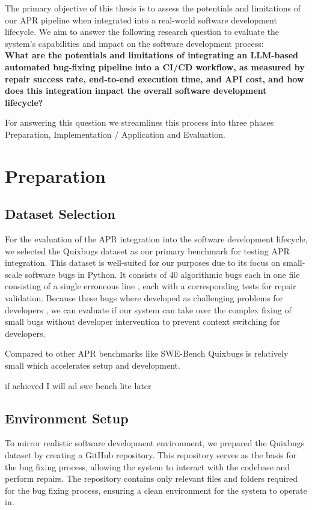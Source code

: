The primary objective of this thesis is to assess the potentials and limitations of our APR pipeline when integrated into a real-world software development lifecycle. We aim to answer the following research question to evaluate the system's capabilities and impact on the software development process: \\
\textbf{What are the potentials and limitations of integrating an LLM-based automated bug-fixing pipeline into a CI/CD workflow, as measured by repair success rate, end-to-end execution time, and API cost, and how does this integration impact the overall software development lifecycle?}

For answering this question we streamlines this process into three phases Preparation, Implementation / Application and Evaluation.



\section{Preparation}
\subsection{Dataset Selection}
For the evaluation of the APR integration into the software development lifecycle, we selected the Quixbugs dataset \cite{linQuixBugsMultilingualProgram2017} as our primary benchmark for testing APR integration. This dataset is well-suited for our purposes due to its focus on small-scale software bugs in Python. It consists of 40 algorithmic bugs each in one file consisting of a single erroneous line , each with a corresponding tests for repair validation. Because these bugs where developed as challenging problems for developers \cite{linQuixBugsMultilingualProgram2017}, we can evaluate if our system can take over the complex fixing of small bugs without developer intervention to prevent context switching for developers.

Compared to other APR benchmarks like SWE-Bench \cite{jimenezSWEbenchCanLanguage2024} Quixbugs is relatively small which accelerates setup and development.

if achieved I will ad swe bench lite later \cite{jimenezSWEbenchCanLanguage2024}

\subsection{Environment Setup}
To mirror realistic software development environment, we prepared the Quixbugs dataset by creating a GitHub repository. This repository serves as the basis for the bug fixing process, allowing the system to interact with the codebase and perform repairs. The repository contains only relevant files and folders required for the bug fixing process, ensuring a clean environment for the system to operate in.

